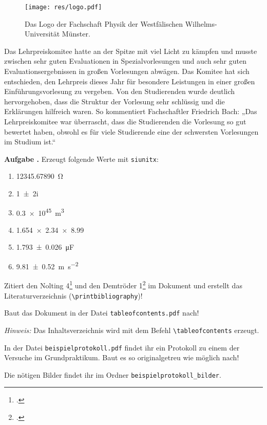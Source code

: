 \documentclass[a4paper, 12pt, headsepline, pagesize, parskip=half-, headlines=3.1]{scrartcl}
\newcounter{aufgabe}
\newenvironment{aufgabe}[1][]{\stepcounter{aufgabe}
\noindent\textbf{Aufgabe \arabic{aufgabe}.} #1\par
\begin{enumerate}[label=\alph*)]}{\end{enumerate}\bigskip}
\newenvironment{aufgabe*}[1][]{\stepcounter{aufgabe}
\noindent\textbf{Aufgabe \arabic{aufgabe}.} #1}{\bigskip}
\begin{document}
\begin{wrapfigure}{r}{0cm}
	\centering
	\texttt{[image: res/logo.pdf]}
	\caption{Das Logo der Fachschaft Physik der Westfälischen Wilhelms-Universität Münster.}
\end{wrapfigure}
Das Lehrpreiskomitee hatte an der Spitze mit viel Licht zu kämpfen und musste zwischen sehr guten Evaluationen in Spezialvorlesungen und auch sehr guten Evaluationsergebnissen in großen Vorlesungen abwägen. Das Komitee hat sich entschieden, den Lehrpreis dieses Jahr für besondere Leistungen in einer großen Einführungsvorlesung zu vergeben. Von den Studierenden wurde deutlich hervorgehoben, dass die Struktur der Vorlesung sehr schlüssig und die Erklärungen hilfreich waren. So kommentiert Fachschaftler Friedrich Bach: „Das Lehrpreiskomitee war überrascht, dass die Studierenden die Vorlesung so gut bewertet haben, obwohl es für viele Studierende eine der schwersten Vorlesungen im Studium ist.“

\begin{aufgabe}[Erzeugt folgende Werte mit \texttt{siunitx}:]
	\item \SI{12345,67890}{\ohm}
	\item \num{1 +- 2i}
	\item \SI{.3e45}{\m\cubed}
	\item \num{1.654 x 2.34 x 8,99}
	\item \SI{1,793 +- 0,026}{\micro\F}
	\item \SI{9,81+-0,52}{\m\per\s\squared}
	\DeactivateWarningFilters
\end{aufgabe}

\begin{aufgabe*}
	Zitiert den Nolting 4\footcite{nolting4} und den Demtröder 1\footcite{demtröder1} im Dokument und erstellt das Literaturverzeichnis (\lstinline!\printbibliography!)!
\end{aufgabe*}

\begin{aufgabe*}
Baut das Dokument in der Datei \texttt{tableofcontents.pdf} nach!

\emph{Hinweis:} Das Inhaltsverzeichnis wird mit dem Befehl \lstinline!\tableofcontents! erzeugt.
\end{aufgabe*}

\begin{aufgabe*}
In der Datei \texttt{beispielprotokoll.pdf} findet ihr ein Protokoll zu einem der Versuche im Grundpraktikum. Baut es so originalgetreu wie möglich nach!

Die nötigen Bilder findet ihr im Ordner \texttt{beispielprotokoll\_bilder}.
\end{aufgabe*}
\end{document}
